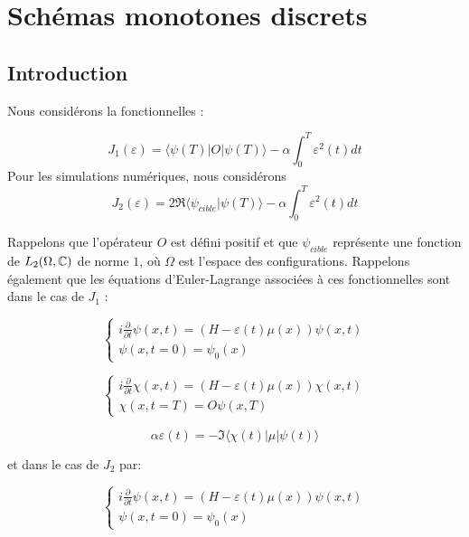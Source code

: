 \chapter{Schémas monotones discrets}

\section{Introduction}
Nous considérons la fonctionnelles :

\begin{equation}
J_1(\varepsilon) = \langle \psi(T)|O|\psi(T) \rangle - \alpha \int_0^T \varepsilon^2(t)dt
\end{equation}
Pour les simulations numériques, nous considérons
\begin{equation}
J_2(\varepsilon) = 2\Re\langle \psi_{cible}|\psi(T)\rangle - \alpha \int_0^T \varepsilon^2(t)dt
\end{equation}

Rappelons que l'opérateur $O$ est défini positif et que $\psi_{cible}$ représente une fonction de $L_2(\Omega,\mathbb C)$ de norme $1$, où $\Omega$ est l'espace des configurations. Rappelons également que les équations d'Euler-Lagrange associées à ces fonctionnelles sont dans le cas de $J_1$ :

\begin{equation}
\begin{cases}
i \frac{\partial}{\partial t} \psi (x,t) = (H - \varepsilon(t)\mu(x))\psi(x,t)\\
\psi(x,t=0)=\psi_0(x)
\end{cases}
\end{equation}

\begin{equation}
\begin{cases}
i \frac{\partial}{\partial t} \chi (x,t) = (H - \varepsilon(t)\mu(x))\chi(x,t)\\
\chi(x,t=T)=O\psi(x,T)
\end{cases}
\end{equation}

\begin{equation}
\alpha\varepsilon(t) = -\Im \langle \chi(t)|\mu|\psi(t)\rangle 
\end{equation}

et dans le cas de $J_2$ par:

\begin{equation}
\begin{cases}
i \frac{\partial}{\partial t} \psi (x,t) = (H - \varepsilon(t)\mu(x))\psi(x,t)\\
\psi(x,t=0)=\psi_0(x)
\end{cases}
\end{equation}

